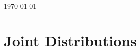 \documentclass[12pt]{article}
\begin{document}
\begin{titlepage}
	
	
	\vfill\vfill\vfill %
	
    {\large\today} %
	
	
    


	 
	
	\vfill %
	
\end{titlepage}


\section{Joint Distributions}
\end{document}
